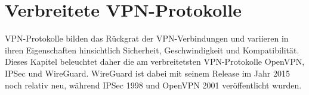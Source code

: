 \chapter{Verbreitete \gls{VPN}-Protokolle} \label{intro-protokolle}

\gls{VPN}-Protokolle bilden das Rückgrat der \gls{VPN}-Verbindungen und variieren in ihren Eigenschaften hinsichtlich Sicherheit, Geschwindigkeit und Kompatibilität. Dieses Kapitel beleuchtet daher die am verbreitetsten \gls{VPN}-Protokolle OpenVPN, \gls{IPSec} und WireGuard. WireGuard ist dabei mit seinem Release im Jahr 2015 \cite{Wireguard_Presentations} noch relativ neu, während \gls{IPSec} 1998 \cite{RFC2401} und OpenVPN 2001 \cite{The_History_of_OpenVPN, OpenVPN_Changelogs} veröffentlicht wurden.